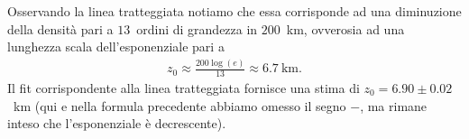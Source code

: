 \begin{solution}

\begin{center}
    
\end{center}

Osservando la linea tratteggiata notiamo che essa corrisponde ad una diminuzione
della densità pari a $13$~ordini di grandezza in $200$~km, ovverosia ad una
lunghezza scala dell'esponenziale pari a
\begin{align*}
  z_0 \approx \frac{200 \log(e)}{13} \approx 6.7~\text{km}.
\end{align*}
Il fit corrispondente alla linea tratteggiata fornisce una stima di $z_0 =6.90 \pm 0.02$~km
(qui e nella formula precedente abbiamo omesso il segno $-$, ma rimane inteso che
l'esponenziale è decrescente).


\end{solution}
